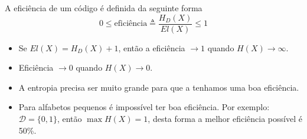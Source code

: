 \begin{frame}[allowframebreaks]
  \begin{definition}
  A eficiência de um código é definida da seguinte forma
	\begin{equation}
	0 \leq \text{eficiência} \triangleq \frac{H_D(X)}{E l(X)} \leq 1
	\end{equation}
  \end{definition}

  \begin{itemize}
  \item Se $E l(X) = H_D (X) + 1$, então a eficiência $\rightarrow 1$ quando $H(X) \rightarrow \infty$.
  \item Eficiência $\rightarrow 0$ quando $H(X) \rightarrow 0$.
  \item A entropia precisa ser muito grande para que a tenhamos uma boa eficiência.
  \item Para alfabetos pequenos é impossível ter boa eficiência. Por exemplo: $\mathcal{D} = \{0,1\}$, então
	$\max H(X) = 1$, desta forma a melhor eficiência possível é 50\%.
  \end{itemize}
\end{frame}


